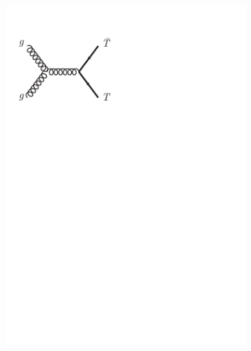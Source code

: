 \begin{figure}[tb!]
  \centering
  \begin{subfigure}{0.35\textwidth}
    \includegraphics[width=\textwidth]{Theory/FeynmanGraphs/T_pairProd_good.pdf}
  \caption{}
  \label{fig:T_pairProd_good}
\end{subfigure}
  \begin{subfigure}{0.35\textwidth}

\end{subfigure}
\end{figure}
